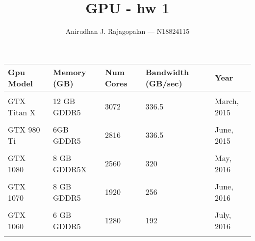 \documentclass{article}
\begin{document}
\title{GPU - hw 1}
\author{Anirudhan J. Rajagopalan --- N18824115}
\maketitle

\newpage

\begin{tabulary}{\textwidth}{LLLLL}
    \bfseries
    Gpu Model & \bfseries Memory (GB) &\bfseries Num Cores &\bfseries Bandwidth (GB/sec) &\bfseries Year \mdseries \\
    \hline \\
    GTX Titan X~\cite{gpu:titan_x} & 12 GB GDDR5 & 3072 & 336.5 & March, 2015 \\\\
    GTX 980 Ti~\cite{gpu:980_ti} & 6GB GDDR5 & 2816 & 336.5 & June, 2015 \\\\
    GTX 1080~\cite{gpu:gtx_1080} &  8 GB GDDR5X & 2560 & 320 & May, 2016    \\\\
    GTX 1070~\cite{gpu:gtx_1070} & 8 GB GDDR5 & 1920 & 256 & June, 2016 \\\\
    GTX 1060~\cite{gpu:gtx_1060} & 6 GB GDDR5 & 1280 & 192 & July, 2016 \\\\
\end{tabulary}



\end{document}
